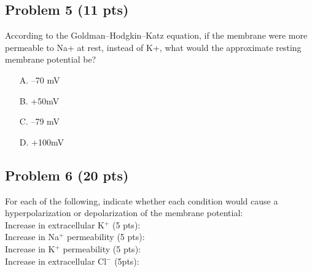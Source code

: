 \documentclass{article}
\begin{document}
\subsection*{Problem 5 (11 pts)}
According to the Goldman–Hodgkin–Katz equation, if the membrane were more permeable to Na+ at rest, instead of K+, what would the approximate resting membrane potential be?
\begin{enumerate} 
    \item[A.] –70 mV
    \item[B.]+50mV %
    \item[C.]–79 mV
    \item[D.]+100mV
\end{enumerate}

\subsection*{Problem 6 (20 pts)}
For each of the following, indicate whether each condition would cause a hyperpolarization or depolarization of the membrane potential:\\

Increase in extracellular K$^+$ (5 pts):\\ %

Increase in Na$^+$ permeability (5 pts):\\ %

Increase in  K$^+$ permeability (5 pts):\\ %

Increase in  extracellular Cl$^-$ (5pts):\\ %
\end{document}
